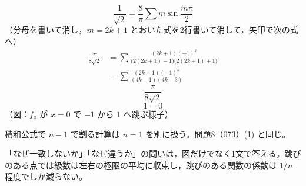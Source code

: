 \[ \frac{1}{\sqrt{2}}=\frac{8}{\pi}\sum m\sin\frac{m\pi}{2} \]
（分母を書いて消し，$m=2k+1$ とおいた式を2行書いて消して，矢印で次の式へ）
\begin{align*}
  \frac{\pi}{8\sqrt{2}}&=\sum\frac{(2k+1)(-1)^{k}}{\bigl(2(2k+1)-1\bigr)\bigl(2(2k+1)+1\bigr)}\\
  &=\sum\frac{(2k+1)(-1)^{k}}{(4k+1)(4k+3)}
\end{align*}
\[ \frac{\pi}{8\sqrt{2}} \]
\[ 1=0 \]
（図：$f_{\mathrm{o}}$ が $x=0$ で $-1$ から $1$ へ跳ぶ様子）
\item 積和公式で $n-1$ で割る計算は $n=1$ を別に扱う。問題8（073）(1) と同じ。
\item 「なぜ一致しないか」「なぜ違うか」の問いは，図だけでなく1文で答える。跳びのある点では級数は左右の極限の平均に収束し，跳びのある関数の係数は $1/n$ 程度でしか減らない。
